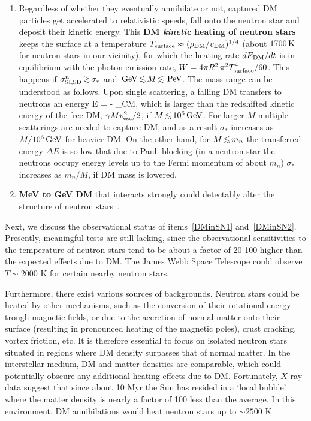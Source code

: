 \begin{enumerate}
\item 
\label{DMinSN2}
Regardless of whether they eventually annihilate or not, captured DM particles get accelerated to relativistic speeds, fall onto the neutron star and deposit their kinetic energy. 
This {\bf DM {\em kinetic} heating of neutron stars}~\cite{DMkineticheatingNS} keeps the surface at a temperature 
$T_{\rm surface} \approx (\rho_{\rm DM}/ v_{\rm DM})^{1/4} $
(about $1700\,{\rm K}$ for neutron stars in our vicinity),
for which the heating rate $dE_{\rm DM}/{dt}$ is in equilibrium with the
photon emission rate,
$W= 4\pi R^2 \, \pi^2 T_{\rm surface}^4/60$.
This happens if $\sigma_{\rm SI,SD}^n\circa{>} \sigma_*$ and $\GeV \circa{<}M \circa{<}\,{\rm PeV}$.
The mass range can be understood as follows.
Upon single scattering, a falling DM transfers to neutrons an energy
\beq \Delta E  =  - \cos\theta_{\rm CM}\rangle,
\eeq
which is larger than the redshifted kinetic energy of the free DM,
$\gamma M v_{\rm esc}^2/2$, if $M \circa{<} 10^6\GeV$.
For larger $M$ multiple scatterings are needed to capture DM, and as a result 
$\sigma_*$ 
increases as $M/10^6\,{\rm GeV}$ for heavier DM.
On the other hand, for $M \circa{<}m_n$ the transferred energy $\Delta E$ is so low that due to Pauli blocking
(in a neutron star the neutrons occupy energy levels up to the Fermi momentum of about $m_n$)
$\sigma_*$ increases as $m_n/M$, if DM mass is lowered.

\item {\bf MeV to GeV DM} that interacts strongly could detectably alter the structure of neutron stars~\cite{1803.03266}.
\end{enumerate}

\smallskip

Next, we discuss the observational status of items~\ref{DMinSN1} and~\ref{DMinSN2}.
Presently, meaningful tests are still lacking, since the observational sensitivities to the temperature of neutron stars 
tend to be about a factor of 20-100 higher than the expected effects due to DM.
The James Webb Space Telescope could observe $T \sim 2000$ K for certain nearby neutron stars.


Furthermore, there exist various sources of backgrounds. 
Neutron stars could be heated by other mechanisms, such as the conversion of
their rotational energy trough magnetic fields, 
or due to the accretion of normal matter onto their surface
(resulting in pronounced heating of the magnetic poles), crust cracking, vortex friction, etc.
It is therefore essential to focus on isolated neutron stars situated in regions where DM density surpasses that of normal matter.
In the interstellar medium, DM and matter densities are comparable, which could potentially obscure any additional heating effects due to DM. 
Fortunately, $X$-ray data suggest that 
since about 10 Myr the Sun has resided in a `local bubble'
where the matter density is nearly a factor of 100 less than the average. 
In this environment, DM annihilations would heat neutron stars up to $\sim 2500$ K.

